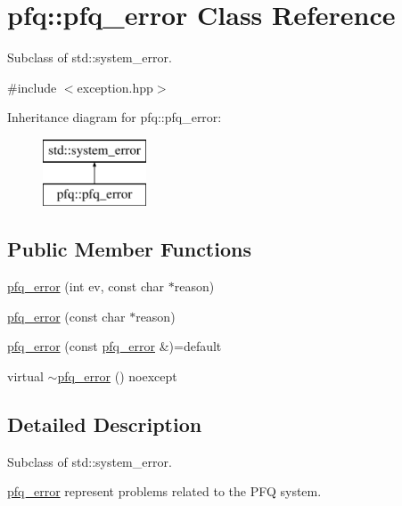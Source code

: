 \hypertarget{classpfq_1_1pfq__error}{\section{pfq\+:\+:pfq\+\_\+error Class Reference}
\label{classpfq_1_1pfq__error}
}


Subclass of std\+::system\+\_\+error.  




{\ttfamily \#include $<$exception.\+hpp$>$}

Inheritance diagram for pfq\+:\+:pfq\+\_\+error\+:\begin{figure}[H]
\begin{center}
\leavevmode
\includegraphics[height=2.000000cm]{classpfq_1_1pfq__error}
\end{center}
\end{figure}
\subsection*{Public Member Functions}
\begin{DoxyCompactItemize}
\item 
\hyperlink{classpfq_1_1pfq__error_a200dca27eee04a6da834364b9342a81d}{pfq\+\_\+error} (int ev, const char $\ast$reason)
\item 
\hyperlink{classpfq_1_1pfq__error_a5af35c9d9dea6aceff0672b92ad6b844}{pfq\+\_\+error} (const char $\ast$reason)
\item 
\hyperlink{classpfq_1_1pfq__error_a64f033ecc5b20bd22872fee3f22fd499}{pfq\+\_\+error} (const \hyperlink{classpfq_1_1pfq__error}{pfq\+\_\+error} \&)=default
\item 
virtual \hyperlink{classpfq_1_1pfq__error_a0aeb73a633e889817967897ef28b3512}{$\sim$pfq\+\_\+error} () noexcept
\end{DoxyCompactItemize}


\subsection{Detailed Description}
Subclass of std\+::system\+\_\+error. 

\hyperlink{classpfq_1_1pfq__error}{pfq\+\_\+error} represent problems related to the P\+F\+Q system. 

